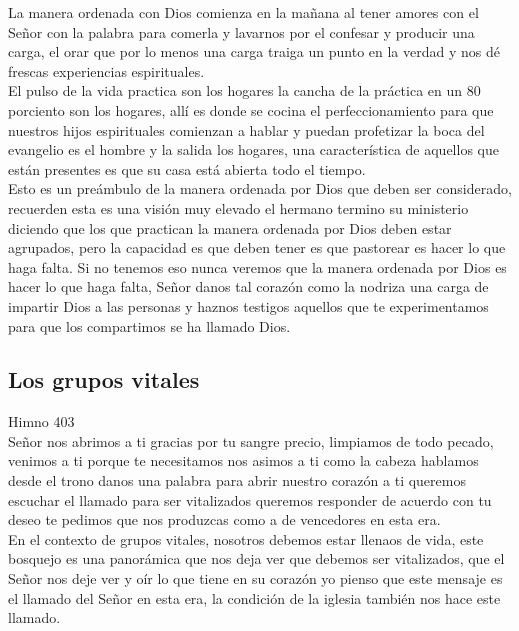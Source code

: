 \documentclass[12pt]{article}
\begin{document}
La manera ordenada con Dios comienza en la mañana al tener amores con el Señor con la palabra para comerla y lavarnos por el confesar y producir una carga, el orar que por lo menos una carga traiga un punto en la verdad y nos dé frescas experiencias espirituales.\\

El pulso de la vida practica son los hogares la cancha de la práctica en un 80 porciento son los hogares, allí es donde se cocina el perfeccionamiento para que nuestros hijos espirituales comienzan a hablar y puedan profetizar la boca del evangelio es el hombre y la salida los hogares, una característica de aquellos que están presentes es que su casa está abierta todo el tiempo.\\
 
Esto es un preámbulo de la manera ordenada por Dios que deben ser considerado, recuerden esta es una visión muy elevado el hermano termino su ministerio diciendo que los que practican la manera ordenada por Dios deben estar agrupados, pero la capacidad es que deben tener es que pastorear es hacer lo que haga falta. Si no tenemos eso nunca veremos que la manera ordenada por Dios es hacer lo que haga falta, Señor danos tal corazón como la nodriza una carga de impartir Dios a las personas y haznos testigos aquellos que te experimentamos para que los compartimos se ha llamado Dios.\\

\subsection*{Los grupos vitales}

Himno 403\\

Señor nos abrimos a ti gracias por tu sangre precio, limpiamos de todo pecado, venimos a ti porque te necesitamos nos asimos a ti como la cabeza hablamos desde el trono danos una palabra para abrir nuestro corazón a ti queremos escuchar el llamado para ser vitalizados queremos responder de acuerdo con tu deseo te pedimos que nos produzcas como a de vencedores en esta era.\\

En el contexto de grupos vitales, nosotros debemos estar llenaos de vida, este bosquejo es una panorámica que nos deja ver que debemos ser vitalizados, que el Señor nos deje ver y oír lo que tiene en su corazón yo pienso que este mensaje es el llamado del Señor en esta era, la condición de la iglesia también nos hace este llamado.\\
\end{document}
